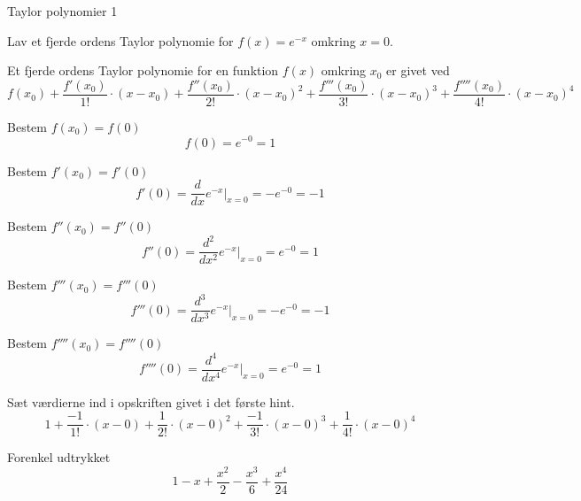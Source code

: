 \documentclass{article}
\begin{document}
\begin{exercise}{Taylor polynomier 1}

Lav et fjerde ordens Taylor polynomie for $f(x) = e^{-x}$
omkring $x = 0$.


\hint
Et fjerde ordens Taylor polynomie for en funktion $f(x)$
omkring $x_0$ er givet ved
\[
f(x_0) + \frac{f'(x_0)}{1!} \cdot (x - x_0) + \frac{f''(x_0)}{2!} \cdot (x - x_0)^2 + \frac{f'''(x_0)}{3!} \cdot (x - x_0)^3 + \frac{f''''(x_0)}{4!} \cdot (x - x_0)^4
\]

\hint
Bestem $f(x_0) = f(0)$
\[
f(0) = e^{-0} = 1
\]

\hint
Bestem $f'(x_0) = f'(0)$
\[
f'(0) = \frac{d}{dx} e^{-x} \Big|_{x = 0} = -e^{-0} = -1
\]

\hint
Bestem $f''(x_0) = f''(0)$
\[
f''(0) = \frac{d^2}{dx^2} e^{-x} \Big|_{x = 0} = e^{-0} = 1
\]

\hint
Bestem $f'''(x_0) = f'''(0)$
\[
f'''(0) = \frac{d^3}{dx^3} e^{-x} \Big|_{x = 0} = -e^{-0} = -1
\]

\hint
Bestem $f''''(x_0) = f''''(0)$
\[
f''''(0) = \frac{d^4}{dx^4} e^{-x} \Big|_{x = 0} = e^{-0} = 1
\]

\hint
Sæt værdierne ind i opskriften givet i det første hint.
\[
1 + \frac{-1}{1!} \cdot (x - 0) + \frac{1}{2!} \cdot (x - 0)^2 + \frac{-1}{3!} \cdot (x - 0)^3 + \frac{1}{4!} \cdot (x - 0)^4
\]

\hint
Forenkel udtrykket
\[
1 - x + \frac{x^2}{2} - \frac{x^3}{6} + \frac{x^4}{24}
\]

\end{exercise}
\end{document}
